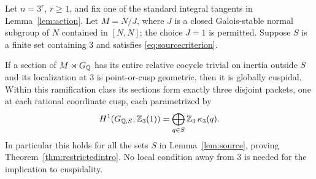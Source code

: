 \begin{theorem}\label{thm:restricted3}
Let $n=3^r$, $r\geq1$, and fix one of the standard integral
tangents in Lemma~\ref{lem:action}. Let $M=N/J$, where $J$ is a
closed Galois-stable normal subgroup of $N$ contained in $[N,N]$;
the choice $J=1$ is permitted. Suppose $S$ is a finite set
containing $3$ and satisfies \eqref{eq:sourcecriterion}.

If a section of $M\rtimes G_\mathbb Q$ has its entire relative cocycle
trivial on inertia outside $S$ and its localization at $3$ is
point-or-cusp geometric, then it is globally cuspidal.
Within this ramification class its sections form exactly three
disjoint packets, one at each rational coordinate cusp, each
parametrized by
\begin{equation}
 H^1(G_{\mathbb Q,S},\mathbb Z_3(1))
    =\bigoplus_{q\in S}\mathbb Z_3\,\kappa_3(q).
 \label{eq:restrictedpackets}
\end{equation}
In particular this holds for all the sets $S$ in
Lemma~\ref{lem:source}, proving Theorem~\ref{thm:restrictedintro}.
No local condition away from $3$ is needed
for the implication to cuspidality.
\end{theorem}
